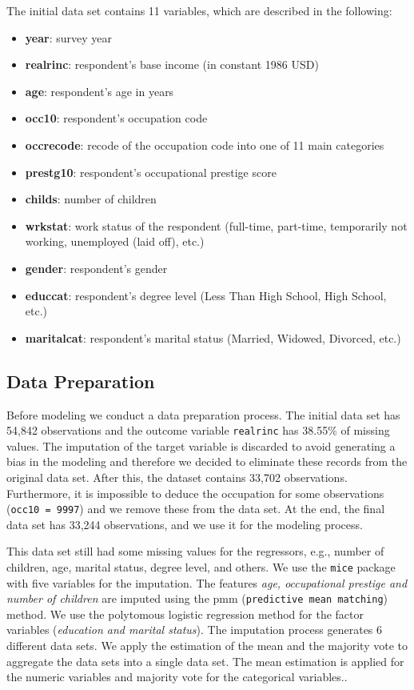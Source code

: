 \documentclass[11pt,a4paper]{article}
\begin{document}
The initial data set contains 11 variables, which are described in the
following:

\begin{itemize}
\item
  \textbf{year}: survey year
\item
  \textbf{realrinc}: respondent's base income (in constant 1986 USD)
\item
  \textbf{age}: respondent's age in years
\item
  \textbf{occ10}: respondent's occupation code
\item
  \textbf{occrecode}: recode of the occupation code into one of 11 main
  categories
\item
  \textbf{prestg10}: respondent's occupational prestige score
\item
  \textbf{childs}: number of children
\item
  \textbf{wrkstat}: work status of the respondent (full-time, part-time,
  temporarily not working, unemployed (laid off), etc.)
\item
  \textbf{gender}: respondent's gender
\item
  \textbf{educcat}: respondent's degree level (Less Than High School,
  High School, etc.)
\item
  \textbf{maritalcat}: respondent's marital status (Married, Widowed,
  Divorced, etc.)
\end{itemize}

\hypertarget{data-preparation}{%
\subsection{Data Preparation}\label{data-preparation}}

Before modeling we conduct a data preparation process. The initial data
set has 54,842 observations and the outcome variable \texttt{realrinc}
has 38.55\% of missing values. The imputation of the target variable is
discarded to avoid generating a bias in the modeling and therefore we
decided to eliminate these records from the original data set. After
this, the dataset contains 33,702 observations. Furthermore, it is
impossible to deduce the occupation for some observations
(\texttt{occ10\ =\ 9997}) and we remove these from the data set. At the
end, the final data set has 33,244 observations, and we use it for the
modeling process.

This data set still had some missing values for the regressors, e.g.,
number of children, age, marital status, degree level, and others. We
use the \texttt{mice} package with five variables for the imputation.
The features \emph{age, occupational prestige and number of children}
are imputed using the pmm (\texttt{predictive\ mean\ matching}) method.
We use the polytomous logistic regression method for the factor
variables (\emph{education and marital status}). The imputation process
generates 6 different data sets. We apply the estimation of the mean and
the majority vote to aggregate the data sets into a single data set. The
mean estimation is applied for the numeric variables and majority vote
for the categorical variables..
\end{document}
